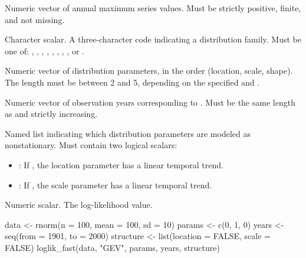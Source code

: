 \documentclass[a4paper]{book}
\begin{document}
\begin{Arguments}
\begin{ldescription}
\item[\code{data}] Numeric vector of annual maximum series values.
Must be strictly positive, finite, and not missing.

\item[\code{distribution}] Character scalar. A three-character code indicating
a distribution family. Must be one of: , , ,
, , , , , or .

\item[\code{params}] Numeric vector of distribution parameters, in the order (location,
scale, shape). The length must be between 2 and 5, depending on the specified
 and .

\item[\code{years}] Numeric vector of observation years corresponding to .
Must be the same length as  and strictly increasing.

\item[\code{structure}] Named list indicating which distribution parameters are
modeled as nonstationary. Must contain two logical scalars:
\begin{itemize}

\item{} : If , the location parameter has a linear temporal trend.
\item{} : If , the scale parameter has a linear temporal trend.

\end{itemize}

\end{ldescription}
\end{Arguments}
%
\begin{Value}
Numeric scalar. The log-likelihood value.
\end{Value}
%
\begin{SeeAlso}
\end{SeeAlso}
%
\begin{Examples}
\begin{ExampleCode}
data <- rnorm(n = 100, mean = 100, sd = 10)
params <- c(0, 1, 0)
years <- seq(from = 1901, to = 2000)
structure <- list(location = FALSE, scale = FALSE)
loglik_fast(data, "GEV", params, years, structure)

\end{ExampleCode}
\end{Examples}
\end{document}
